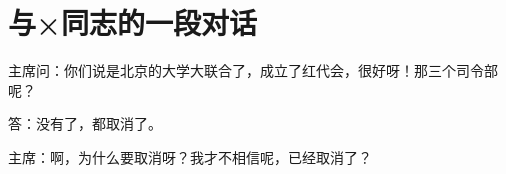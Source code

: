 \section[与×同志的一段对话（一九六七年四月）]{与×同志的一段对话}


主席问：你们说是北京的大学大联合了，成立了红代会，很好呀！那三个司令部呢？

答：没有了，都取消了。

主席：啊，为什么要取消呀？我才不相信呢，已经取消了？


